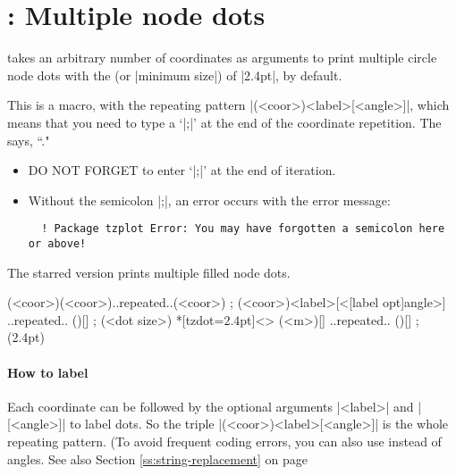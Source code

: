 \section{\protect\cmd{\tzdots(*)}: Multiple node dots}
\label{s:tzdots}

\icmd{\tzdots} takes an arbitrary number of coordinates as arguments to print multiple circle node dots with the  (or |minimum size|) of |2.4pt|, by default.

This is a  macro, with the repeating pattern |(<coor>){<label>}[<angle>]|, which means that you need to type a  `|;|' at the end of the coordinate repetition. The  says, ``."

\remark
\begin{itemize}\firmlist
\item DO NOT FORGET to enter `|;|' at the end of iteration.
\item Without the semicolon |;|, an error occurs with the error message:
  \begin{verbatim}
  ! Package tzplot Error: You may have forgotten a semicolon here or above!
  \end{verbatim}
\end{itemize}

The starred version \icmd{\tzdots*} prints multiple filled node dots.

\begin{tzdef}
\tzdots*(<coor>)(<coor>)..repeated..(<coor>) ;
 (<coor>){<label>}[<[label opt]angle>]
                                 ..repeated.. (){}[] ; (<dot size>)
 *[tzdot=2.4pt]<> (<m>){}[] ..repeated.. (){}[] ; (2.4pt)
\end{tzdef}

\begin{tzcode}{.3}
\end{tzcode}

\paragraph{How to label}

Each coordinate can be followed by the optional arguments |{<label>}| and |[<angle>]| to label dots. So the triple |(<coor>){<label>}[<angle>]| is the whole repeating pattern.
(To avoid frequent coding errors, you can also use  instead of angles. See also Section \ref{ss:string-replacement} on page \pageref{ss:string-replacement}

